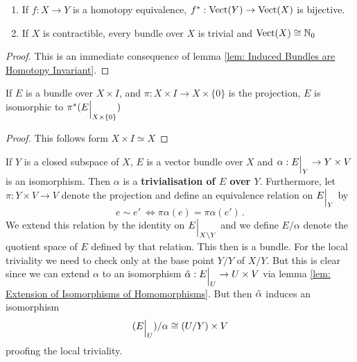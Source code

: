 \begin{lemma}\label{lem: contractible bundles are tivial}
	\begin{enumerate}
		\item If $f:X\to Y$ is a homotopy equivalence, $f^*:\operatorname{\mathrm{Vect}}(Y)\to \operatorname{\mathrm{Vect}}(X)$ is bijective.
		\item If $X$ is contractible, every bundle over $X$ is trivial and $\operatorname{\mathrm{Vect}}(X)\cong \mathbb{N}_0$
	\end{enumerate}
\end{lemma}
\begin{proof}
	This is an immediate consequence of lemma \ref{lem: Induced Bundles are Homotopy Invariant}.
\end{proof}
\begin{lemma}
	If $E$ is a bundle over $X\times I$, and $\pi:X\times I \to X\times \{0\}$ is the projection, $E$ is isomorphic to $\pi^*({E}\einsch{X\times \{0\}})$
\end{lemma}
\begin{proof}
	This follows form $X\times I \simeq X$
\end{proof}
\begin{definition}\label{def: Trivialisation of a Vector Bundle}
	If $Y$ is a closed subspace of $X$, $E$ is a vector bundle over $X$ and $\alpha:{E}\einsch{Y}\to Y\times V$ is an isomorphism. Then $\alpha$ is a \textbf{trivialisation of $E$ over $Y$}. Furthermore, let $\pi: Y \times V \to V$ denote the projection and define an equivalence relation on ${E}\einsch{Y}$ by 
	\begin{equation*}
		e\sim e' ~ \Leftrightarrow \pi \alpha (e) =\pi \alpha (e') \, .
	\end{equation*}  We extend this relation by the identity on ${E}\einsch{X\setminus Y}$ and we define $E\slash \alpha$ denote the quotient space of $E$ defined by that relation. This then is a bundle. For the local triviality we need to check only at the base point $Y\slash Y$ of $X\slash Y$. But this is clear since we can extend $\alpha$ to an isomorphism $\Tilde{\alpha}:{E}\einsch{U}\to U \times V$ via lemma \ref{lem: Extension of Isomorphisms of Homomorphisms}. But then $\Tilde{\alpha}$ induces an isomorphism
	\begin{equation*}
		({E}\einsch{U})\slash \alpha \cong  (U\slash Y) \times V
	\end{equation*}
	proofing the local triviality.
\end{definition} 

